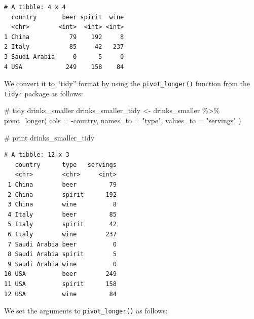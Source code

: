 \documentclass[
  letterpaper,
  DIV=11,
  numbers=noendperiod]{scrreprt}
\newenvironment{Shaded}{\begin{snugshade}}{\end{snugshade}}
\newcommand{\AttributeTok}[1]{\textcolor[rgb]{0.40,0.45,0.13}{#1}}
\newcommand{\CommentTok}[1]{\textcolor[rgb]{0.37,0.37,0.37}{#1}}
\newcommand{\FunctionTok}[1]{\textcolor[rgb]{0.28,0.35,0.67}{#1}}
\newcommand{\NormalTok}[1]{\textcolor[rgb]{0.00,0.23,0.31}{#1}}
\newcommand{\OtherTok}[1]{\textcolor[rgb]{0.00,0.23,0.31}{#1}}
\newcommand{\SpecialCharTok}[1]{\textcolor[rgb]{0.37,0.37,0.37}{#1}}
\newcommand{\StringTok}[1]{\textcolor[rgb]{0.13,0.47,0.30}{#1}}
\theoremstyle{definition}
\theoremstyle{remark}
\begin{document}
\begin{verbatim}
# A tibble: 4 x 4
  country       beer spirit  wine
  <chr>        <int>  <int> <int>
1 China           79    192     8
2 Italy           85     42   237
3 Saudi Arabia     0      5     0
4 USA            249    158    84
\end{verbatim}

We convert it to ``tidy'' format by using the \texttt{pivot\_longer()}
function from the \texttt{tidyr} package as follows:

\begin{Shaded}
\begin{Highlighting}[]
\CommentTok{\# tidy drinks\_smaller}
\NormalTok{drinks\_smaller\_tidy }\OtherTok{\textless{}{-}}\NormalTok{ drinks\_smaller }\SpecialCharTok{\%\textgreater{}\%} 
  \FunctionTok{pivot\_longer}\NormalTok{(}
    \AttributeTok{cols =} \SpecialCharTok{{-}}\NormalTok{country, }
    \AttributeTok{names\_to =} \StringTok{"type"}\NormalTok{, }
    \AttributeTok{values\_to =} \StringTok{"servings"}
\NormalTok{  )}

\CommentTok{\# print}
\NormalTok{drinks\_smaller\_tidy}
\end{Highlighting}
\end{Shaded}

\begin{verbatim}
# A tibble: 12 x 3
   country      type   servings
   <chr>        <chr>     <int>
 1 China        beer         79
 2 China        spirit      192
 3 China        wine          8
 4 Italy        beer         85
 5 Italy        spirit       42
 6 Italy        wine        237
 7 Saudi Arabia beer          0
 8 Saudi Arabia spirit        5
 9 Saudi Arabia wine          0
10 USA          beer        249
11 USA          spirit      158
12 USA          wine         84
\end{verbatim}

We set the arguments to \texttt{pivot\_longer()} as follows:
\end{document}
